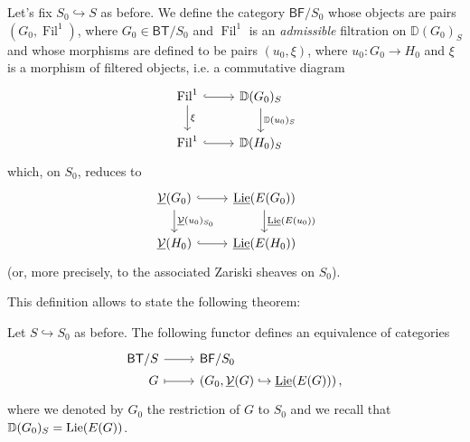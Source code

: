 \begin{defn}[]
	Let's fix $S_0 \hookrightarrow S$ as before.
	We define the category $\mathsf{BF}/S_0$ whose objects
	are pairs $(G_0, \operatorname{Fil}^1)$, where $G_0 \in \mathsf{BT}/S_0$
	and $\operatorname{Fil}^1$ is an \emph{admissible} filtration on
	$\mathbb{D}(G_0)_S$ and whose morphisms are defined to be
	pairs $(u_0, \xi)$, where $u_0\colon G_0 \to H_0$
	and $\xi$ is a morphism of filtered objects, i.e$.$ a commutative diagram
	\begin{equation*}
	\begin{tikzcd}
		\operatorname{Fil}^1 \arrow[d, "\xi", rightarrow] 
		\arrow[r, "", hookrightarrow] &
		\mathbb{D}(G_0)_S 
		\arrow[d, "\mathbb{D}(u_0)_S", rightarrow] \\
		\operatorname{Fil}^1 \arrow[r, "", hookrightarrow] &
		\mathbb{D}(H_0)_S
	\end{tikzcd}
	\end{equation*}
	which, on $S_0$, reduces to
	\begin{equation*}
	\begin{tikzcd}
		\underline{\mathcal{V}}(G_0) \arrow[r, "", hookrightarrow] 
		\arrow[d, "\underline{\mathcal{V}}(u_0)_{S_0}", rightarrow] &
		\underline{\lie}(E(G_0))
		\arrow[d, "\underline{\lie}(E(u_0))", rightarrow] \\
		\underline{\mathcal{V}}(H_0) \arrow[r, "", hookrightarrow] &
		\underline{\lie}(E(H_0))
	\end{tikzcd}
	\end{equation*}
	(or, more precisely, to the associated Zariski sheaves on $S_0$).
\end{defn}


\noindent
This definition allows to state the following theorem:
\begin{thm}\label{thm:EquivCatBTS}
	Let $S \hookrightarrow S_0$ as before.
	The following functor defines an equivalence of categories
	\begin{equation*}
	\begin{tikzcd}[row sep = 0ex
		,/tikz/column 1/.append style={anchor=base east}
		,/tikz/column 2/.append style={anchor=base west}]
		\mathsf{BT}/S \arrow[r, "", rightarrow] &
		\mathsf{BF}/S_0 \\
		G \arrow[r, "", mapsto] & 
		\left(G_0, \underline{\mathcal{V}}(G) \hookrightarrow \underline{\lie}(E(G))\right)
	,\end{tikzcd}
	\end{equation*} 
	where we denoted by $G_0$ the restriction of $G$ to $S_0$
	and we recall that $\mathbb{D}(G_0)_S = \operatorname{Lie}(E(G))$.
\end{thm}


